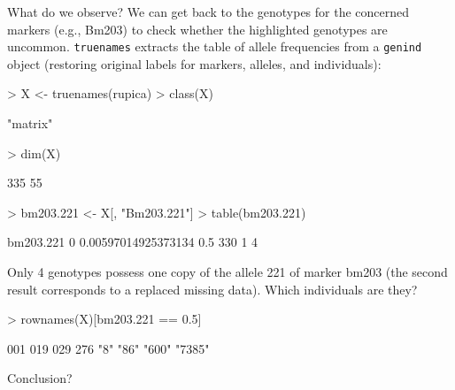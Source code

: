 \documentclass{article}
\begin{document}
\noindent What do we observe?
We can get back to the genotypes for the concerned markers (e.g.,
Bm203) to check whether the highlighted genotypes are uncommon.
\texttt{truenames} extracts the table of allele frequencies from a
\texttt{genind} object (restoring original labels for markers, alleles, and individuals):
\begin{Schunk}
\begin{Sinput}
> X <- truenames(rupica)
> class(X)
\end{Sinput}
\begin{Soutput}
[1] "matrix"
\end{Soutput}
\begin{Sinput}
> dim(X)
\end{Sinput}
\begin{Soutput}
[1] 335  55
\end{Soutput}
\begin{Sinput}
> bm203.221 <- X[, "Bm203.221"]
> table(bm203.221)
\end{Sinput}
\begin{Soutput}
bm203.221
                  0 0.00597014925373134                 0.5 
                330                   1                   4 
\end{Soutput}
\end{Schunk}
Only 4 genotypes possess one copy of the allele 221 of marker bm203 (the second result
corresponds to a replaced missing data).
Which individuals are they?
\begin{Schunk}
\begin{Sinput}
> rownames(X)[bm203.221 == 0.5]
\end{Sinput}
\begin{Soutput}
   001    019    029    276 
   "8"   "86"  "600" "7385" 
\end{Soutput}
\end{Schunk}
Conclusion?
\\






\end{document}
